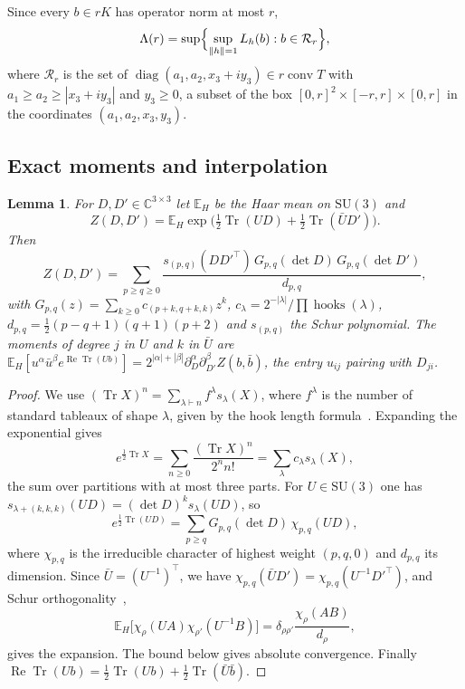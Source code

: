 \documentclass[aps,prd,twocolumn,superscriptaddress,nofootinbib,longbibliography,floatfix,amsmath,amssymb,10pt]{revtex4-2}
\newtheorem{lemma}[theorem]{Lemma}
\theoremstyle{definition}
\theoremstyle{remark}
\newcommand{\C}{\mathbb{C}}
\newcommand{\E}{\mathbb{E}}
\newcommand{\SU}{\mathrm{SU}}
\newcommand{\Tr}{\operatorname{Tr}}
\newcommand{\ReTr}{\operatorname{Re}\operatorname{Tr}}
\begin{document}
Since every $b\in rK$ has operator norm at most $r$,
\[
\Lambda(r)=\sup\Bigl\{\sup_{\|h\|=1}L_h(b):b\in\mathcal R_r\Bigr\},
\]
where $\mathcal R_r$ is the set of $\operatorname{diag}(a_1,a_2,x_3+iy_3)\in
r\operatorname{conv}T$ with $a_1\ge a_2\ge|x_3+iy_3|$ and $y_3\ge0$, a subset of
the box $[0,r]^2\times[-r,r]\times[0,r]$ in the coordinates
$(a_1,a_2,x_3,y_3)$.

\subsection{Exact moments and interpolation}

\begin{lemma}\label{lem:characters}
For $D,D'\in\C^{3\times3}$ let $\E_H$ be the Haar mean on $\SU(3)$ and
\[
Z(D,D')=\E_H\exp\bigl(\tfrac12\Tr(UD)+\tfrac12\Tr(\bar UD')\bigr).
\]
Then
\[
Z(D,D')=\sum_{p\ge q\ge0}\frac{s_{(p,q)}(DD'^{\top})\,G_{p,q}(\det D)\,
G_{p,q}(\det D')}{d_{p,q}} ,
\]
with $G_{p,q}(z)=\sum_{k\ge0}c_{(p+k,q+k,k)}z^k$, $c_\lambda=2^{-|\lambda|}/
\prod\operatorname{hooks}(\lambda)$, $d_{p,q}=\frac12(p-q+1)(q+1)(p+2)$ and
$s_{(p,q)}$ the Schur polynomial. The moments of degree $j$ in $U$ and $k$ in
$\bar U$ are $\E_H[u^\alpha\bar u^{\beta}e^{\ReTr(Ub)}]=2^{|\alpha|+|\beta|}
\partial_D^\alpha\partial_{D'}^{\beta}Z(b,\bar b)$, the entry $u_{ij}$ pairing with
$D_{ji}$.
\end{lemma}

\begin{proof}
We use $(\Tr X)^n=\sum_{\lambda\vdash n}f^\lambda s_\lambda(X)$, where
$f^\lambda$ is the number of standard tableaux of shape $\lambda$, given by
the hook length formula~\cite[Cor.~7.21.6]{Sta99}. Expanding the
exponential gives
\[
e^{\frac12\Tr X}=\sum_{n\ge0}\frac{(\Tr X)^n}{2^nn!}=\sum_\lambda
c_\lambda s_\lambda(X),
\]
the sum over partitions with at most three parts. For $U\in\SU(3)$ one has
$s_{\lambda+(k,k,k)}(UD)=(\det D)^ks_\lambda(UD)$, so
\[
e^{\frac12\Tr(UD)}=\sum_{p\ge q}G_{p,q}(\det D)\,\chi_{p,q}(UD),
\]
where $\chi_{p,q}$ is the irreducible character of highest weight
$(p,q,0)$ and $d_{p,q}$ its dimension. Since $\bar U=(U^{-1})^\top$, we have
$\chi_{p,q}(\bar UD')=\chi_{p,q}(U^{-1}D'^\top)$, and Schur
orthogonality~\cite[Ch.~2]{Bum13},
\[
\E_H\bigl[\chi_\rho(UA)\chi_{\rho'}(U^{-1}B)\bigr]=
\delta_{\rho\rho'}\frac{\chi_\rho(AB)}{d_\rho},
\]
gives the expansion. The bound below gives absolute convergence. Finally $\ReTr(Ub)=
\frac12\Tr(Ub)+\frac12\Tr(\bar U\bar b)$.
\end{proof}
\end{document}
